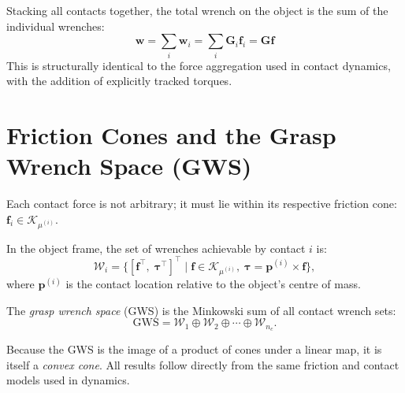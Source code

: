 \documentclass[11pt,twoside]{report}
\theoremstyle{definition}
\theoremstyle{plain}
\theoremstyle{remark}
\newcommand{\0}{\bm{0}}
\newcommand{\Kc}{\mathcal{K}}
\begin{document}
Stacking all contacts together, the total wrench on the object is the sum of the individual wrenches:
\begin{equation}
\bm{w} = \sum_{i} \bm{w}_{i} = \sum_{i} \bm{G}_{i} \bm{f}_{i} = \bm{G} \bm{f}
\end{equation}
This is structurally identical to the force aggregation used in contact dynamics, with the addition of explicitly tracked torques.

\section{Friction Cones and the Grasp Wrench Space (GWS)}

Each contact force is not arbitrary; it must lie within its respective friction cone: $\bm{f}_{i} \in \Kc_{\mu^{(i)}}$.

In the object frame, the set of wrenches achievable by contact $i$ is:
\begin{equation}
\mathcal{W}_{i}=\bigl\{[\bm{f}^{\!\top},\;\bm{\tau}^{\!\top}]^{\!\top}
\;\big|\;\bm{f}\in\Kc_{\mu^{(i)}},\;
\bm{\tau}=\bm{p}^{(i)}\times\bm{f}\bigr\},
\end{equation}
where $\bm{p}^{(i)}$ is the contact location relative to the object's centre of mass.

The \emph{grasp wrench space} (GWS) is the Minkowski sum of all contact wrench sets:
\begin{equation}
\text{GWS}=\mathcal{W}_{1}\oplus\mathcal{W}_{2}\oplus\cdots\oplus\mathcal{W}_{n_{c}}.
\end{equation}

\begin{insightbox}
Because the GWS is the image of a product of cones under a linear map, it is itself a \emph{convex cone}. All results follow directly from the same friction and contact models used in dynamics.
\end{insightbox}
\end{document}

